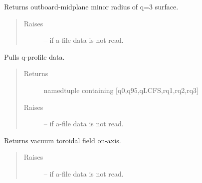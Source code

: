 \documentclass[letterpaper,10pt,english]{sphinxmanual}
\begin{document}
\begin{fulllineitems}

\begin{fulllineitems}
\label{eqtools:eqtools.eqdskreader.EqdskReader.getQ3Surf}
Returns outboard-midplane minor radius of q=3 surface.
\begin{quote}\begin{description}
\item[{Raises}] \leavevmode
{} -- if a-file data is not read.

\end{description}\end{quote}

\end{fulllineitems}


\begin{fulllineitems}
\label{eqtools:eqtools.eqdskreader.EqdskReader.getQs}
Pulls q-profile data.
\begin{quote}\begin{description}
\item[{Returns}] \leavevmode
namedtuple containing {[}q0,q95,qLCFS,rq1,rq2,rq3{]}

\item[{Raises}] \leavevmode
{} -- if a-file data is not read.

\end{description}\end{quote}

\end{fulllineitems}


\begin{fulllineitems}
\label{eqtools:eqtools.eqdskreader.EqdskReader.getBtVac}
Returns vacuum toroidal field on-axis.
\begin{quote}\begin{description}
\item[{Raises}] \leavevmode
{} -- if a-file data is not read.

\end{description}\end{quote}


\end{fulllineitems}
\end{fulllineitems}
\end{document}
